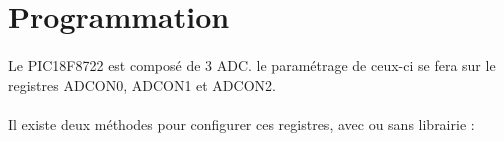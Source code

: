 \section{Programmation}
\paragraph{}
Le PIC18F8722 est composé de 3 ADC. le paramétrage de ceux-ci  se fera sur le registres ADCON0, ADCON1 et ADCON2.
\paragraph{}
Il existe deux méthodes pour configurer ces registres, avec ou sans librairie : 

